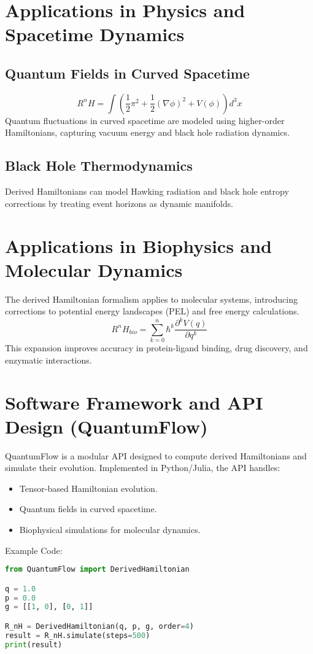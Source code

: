 \documentclass{article}
\begin{document}
\section{Applications in Physics and Spacetime Dynamics}
\subsection{Quantum Fields in Curved Spacetime}
\[
R^nH = \int \left( \frac{1}{2} \pi^2 + \frac{1}{2} (\nabla \phi)^2 + V(\phi) \right) d^3x
\]
Quantum fluctuations in curved spacetime are modeled using higher-order Hamiltonians, capturing vacuum energy and black hole radiation dynamics.

\subsection{Black Hole Thermodynamics}
Derived Hamiltonians can model Hawking radiation and black hole entropy corrections by treating event horizons as dynamic manifolds.

\section{Applications in Biophysics and Molecular Dynamics}
The derived Hamiltonian formalism applies to molecular systems, introducing corrections to potential energy landscapes (PEL) and free energy calculations.
\[
R^nH_{bio} = \sum_{k=0}^n \hbar^k \frac{\partial^k V(q)}{\partial q^k}
\]
This expansion improves accuracy in protein-ligand binding, drug discovery, and enzymatic interactions.

\section{Software Framework and API Design (QuantumFlow)}
QuantumFlow is a modular API designed to compute derived Hamiltonians and simulate their evolution. Implemented in Python/Julia, the API handles:
\begin{itemize}
    \item Tensor-based Hamiltonian evolution.
    \item Quantum fields in curved spacetime.
    \item Biophysical simulations for molecular dynamics.
\end{itemize}

Example Code:
\begin{lstlisting}[language=Python]
from QuantumFlow import DerivedHamiltonian

q = 1.0
p = 0.0
g = [[1, 0], [0, 1]]

R_nH = DerivedHamiltonian(q, p, g, order=4)
result = R_nH.simulate(steps=500)
print(result)
\end{lstlisting}
\end{document}
